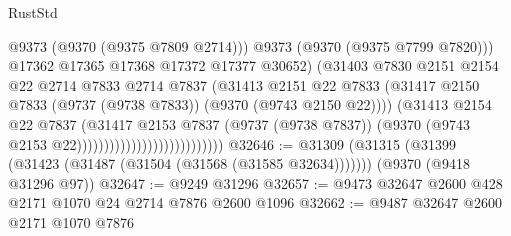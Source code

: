 \begin{lexlean}{RustStd}
\begin{coremodule}
{\begin{coremodule}
{{{{{{{{{{{{{{{{{{{{{{{{{{{{{{{{{{{{{{{                                                      @9373
                                                      (@9370 (@9375 @7809 @2714)))
                                                    @9373
                                                    (@9370 (@9375 @7799 @7820)))
                                                  @17362
                                                  @17365
                                                  @17368
                                                  @17372
                                                  @17377
                                                  @30652)
                                                (@31403
                                                  @7830
                                                  @2151
                                                  @2154
                                                  @22
                                                  @2714
                                                  @7833
                                                  @2714
                                                  @7837
                                                  (@31413
                                                    @2151
                                                    @22
                                                    @7833
                                                    (@31417
                                                      @2150
                                                      @7833
                                                      (@9737 (@9738 @7833))
                                                      (@9370 (@9743 @2150 @22))))
                                                  (@31413
                                                    @2154
                                                    @22
                                                    @7837
                                                    (@31417
                                                      @2153
                                                      @7837
                                                      (@9737 (@9738 @7837))
                                                      (@9370
                                                        (@9743 @2153 @22)))))))))))))))))))))))))))
@32646 := @31309
    (@31315 (@31399 (@31423 (@31487 (@31504 (@31568 (@31585 @32634)))))))
    (@9370 (@9418 @31296 @97))
@32647 := @9249 @31296
@32657 := @9473 @32647 @2600 @428 @2171 @1070 @24 @2714 @7876 @2600 @1096
@32662 := @9487 @32647 @2600 @2171 @1070 @7876
}}}}}}}}}}}}}}}}}}}}}}}}}}}}}}}}}}}}}}}
\end{coremodule}}
\end{coremodule}
\end{lexlean}
